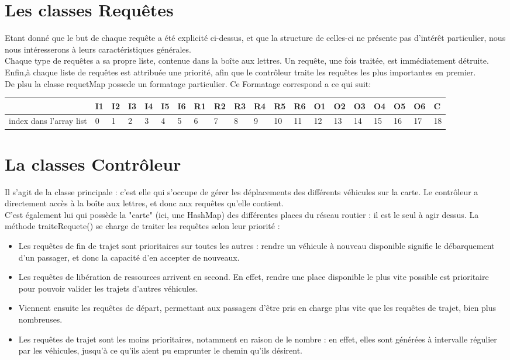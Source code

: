 \documentclass[a4paper, titlepage]{report}
\begin{document}
\section{Les classes Requêtes}

Etant donné que le but de chaque requête a été explicité ci-dessus, et que la structure de celles-ci ne présente pas d'intérêt particulier, nous nous intéresserons à leurs caractéristiques générales. \\
Chaque type de requêtes a sa propre liste, contenue dans la boîte aux lettres. Un requête, une fois traitée, est immédiatement détruite. Enfin,à chaque liste de requêtes est attribuée une priorité, afin que le contrôleur traite les requêtes les plus importantes en premier.
\\ De plsu la classe requetMap possede un formatage particulier. Ce Formatage correspond a ce qui suit:
\begin{tabular}{|l|l|l|l|l|l|l|l|l|l|l|l|l|l|l|l|l|l|l|l|}

\hline
 & I1 & I2 & I3 & I4 & I5 & I6 & R1 & R2 & R3 & R4 & R5 & R6 & O1 & O2 & O3 & O4 & O5 & O6 & C \\
  \hline
  index dans l'array list & 0 & 1 & 2 & 3 & 4 & 5 & 6 & 7 & 8 & 9 & 10 & 11 & 12 & 13 & 14 & 15 & 16 & 17 & 18\\
 \hline
 \end{tabular}
\section{La classes Contrôleur}

Il s'agit de la classe principale : c'est elle qui s'occupe de gérer les déplacements des différents véhicules sur la carte. Le contrôleur a directement accès à la boîte aux lettres, et donc aux requêtes qu'elle contient.\\
C'est également lui qui possède la "carte" (ici, une HashMap) des différentes places du réseau routier : il est le seul à agir dessus.
La méthode traiteRequete() se charge de traiter les requêtes selon leur priorité :\\
 \begin{itemize}
      \item Les requêtes de fin de trajet sont prioritaires sur toutes les autres : rendre un véhicule à nouveau disponible signifie le débarquement d'un passager, et donc la capacité d'en accepter de nouveaux.
      \item Les requêtes de libération de ressources arrivent en second. En effet, rendre une place disponible le plus vite possible est prioritaire pour pouvoir valider les trajets d'autres véhicules.
      \item Viennent ensuite les requêtes de départ, permettant aux passagers d'être pris en charge plus vite que les requêtes de trajet, bien plus nombreuses.
      \item Les requêtes de trajet sont les moins prioritaires, notamment en raison de le nombre : en effet, elles sont générées à intervalle régulier par les véhicules, jusqu'à ce qu'ils aient pu emprunter le chemin qu'ils désirent.
      \end{itemize}
\end{document}
